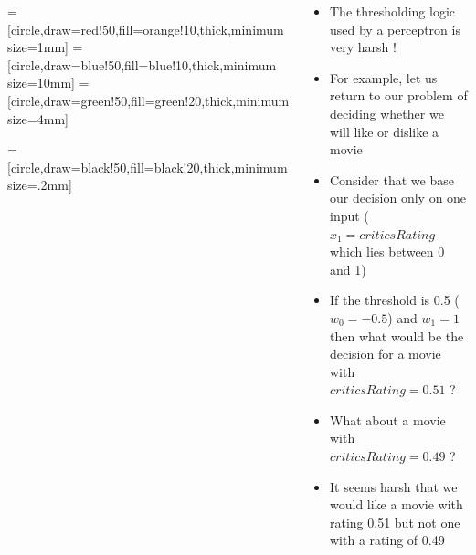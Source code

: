 \documentclass[serif, aspectratio=169]{beamer}
\begin{document}
\begin{frame}
\begin{columns}

\begin{overlayarea}{\textwidth}{\textheight}
\begin{center}

=[circle,draw=red!50,fill=orange!10,thick,minimum size=1mm]
=[circle,draw=blue!50,fill=blue!10,thick,minimum size=10mm]
=[circle,draw=green!50,fill=green!20,thick,minimum size=4mm]

=[circle,draw=black!50,fill=black!20,thick,minimum size=.2mm]



\end{center}

\end{overlayarea}

\begin{overlayarea}{\textwidth}{\textheight}
\begin{itemize}\justifying
\item<1-> The thresholding logic used by a perceptron is very harsh !
\item<2-> For example, let us return to our problem of deciding whether we will like or dislike a movie
\item<3-> Consider that we base our decision only on one input ($x_1 = criticsRating$ which lies between 0 and 1)
\item<4-> If the threshold is 0.5 ($w_0 = -0.5$) and $w_1 = 1$ then what would be the decision for a movie with $criticsRating=0.51$ ? 
\item<6-> What about a movie with $criticsRating=0.49$ ? 
\item<8-> It seems harsh that we would like a movie with rating 0.51 but not one with a rating of 0.49
\end{itemize}
\end{overlayarea}
\end{columns}
\end{frame}
\end{document}
